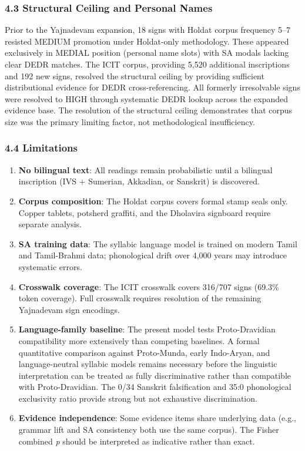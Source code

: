 \documentclass[
  11pt,
]{article}
\providecommand{\tightlist}{%
  \setlength{\itemsep}{0pt}\setlength{\parskip}{0pt}}
\begin{document}
\subsubsection{4.3 Structural Ceiling and Personal
Names}\label{structural-ceiling-and-personal-names}

Prior to the Yajnadevam expansion, 18 signs with Holdat corpus frequency
5--7 resisted MEDIUM promotion under Holdat-only methodology. These
appeared exclusively in MEDIAL position (personal name slots) with SA
modals lacking clear DEDR matches. The ICIT corpus, providing
5,520 additional inscriptions and 192 new signs, resolved the structural
ceiling by providing sufficient distributional evidence for DEDR
cross-referencing. All formerly irresolvable signs were resolved to HIGH
through systematic DEDR lookup across the expanded evidence base. The
resolution of the structural ceiling demonstrates that corpus size was
the primary limiting factor, not methodological insufficiency.

\subsubsection{4.4 Limitations}\label{limitations}

\begin{enumerate}
\def\labelenumi{\arabic{enumi}.}
\tightlist
\item
  \textbf{No bilingual text}: All readings remain probabilistic until a
  bilingual inscription (IVS + Sumerian, Akkadian, or Sanskrit) is
  discovered.
\item
  \textbf{Corpus composition}: The Holdat corpus covers formal stamp
  seals only. Copper tablets, potsherd graffiti, and the Dholavira
  signboard require separate analysis.
\item
  \textbf{SA training data}: The syllabic language model is trained on
  modern Tamil and Tamil-Brahmi data; phonological drift over 4,000
  years may introduce systematic errors.
\item
  \textbf{Crosswalk coverage}: The ICIT crosswalk covers 316/707
  signs (69.3\% token coverage). Full crosswalk requires resolution of
  the remaining Yajnadevam sign encodings.
\item
  \textbf{Language-family baseline}: The present model tests
  Proto-Dravidian compatibility more extensively than competing
  baselines. A formal quantitative comparison against Proto-Munda, early
  Indo-Aryan, and language-neutral syllabic models remains necessary
  before the linguistic interpretation can be treated as fully
  discriminative rather than compatible with Proto-Dravidian. The 0/34
  Sanskrit falsification and 35:0 phonological exclusivity ratio provide
  strong but not exhaustive discrimination.
\item
  \textbf{Evidence independence}: Some evidence items share underlying
  data (e.g., grammar lift and SA consistency both use the same corpus).
  The Fisher combined \emph{p} should be interpreted as indicative
  rather than exact.
\end{enumerate}
\end{document}
